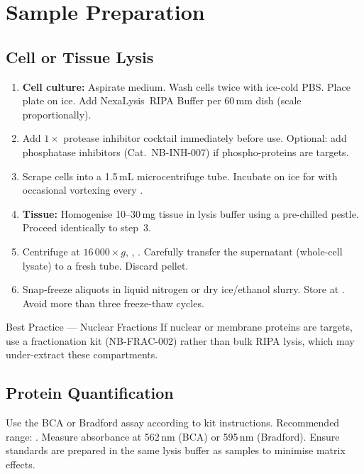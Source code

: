 
\section{Sample Preparation}

\subsection{Cell or Tissue Lysis}

\begin{enumerate}
  \item \textbf{Cell culture:} Aspirate medium. Wash cells twice with ice-cold PBS.
        Place plate on ice. Add  NexaLysis\texttrademark~RIPA Buffer
        per 60\,mm dish (scale proportionally).
  \item Add $1\times$ protease inhibitor cocktail immediately before use. Optional:
        add phosphatase inhibitors (Cat.\ NB-INH-007) if phospho-proteins are targets.
  \item Scrape cells into a 1.5\,mL microcentrifuge tube. Incubate on ice for
         with occasional vortexing every .
  \item \textbf{Tissue:} Homogenise 10--30\,mg tissue in  lysis buffer
        using a pre-chilled pestle. Proceed identically to step~3.
  \item Centrifuge at $16\,000 \times g$, , .
        Carefully transfer the supernatant (whole-cell lysate) to a fresh tube.
        Discard pellet.
  \item Snap-freeze aliquots in liquid nitrogen or dry ice/ethanol slurry.
        Store at . Avoid more than three freeze-thaw cycles.
\end{enumerate}

\par
\begin{tipbox}{Best Practice — Nuclear Fractions}
If nuclear or membrane proteins are targets, use a fractionation kit
(NB-FRAC-002) rather than bulk RIPA lysis, which may under-extract these
compartments.
\end{tipbox}

\subsection{Protein Quantification}

\par\vspace{4pt}
Use the BCA or Bradford assay according to kit instructions. Recommended range:
. Measure absorbance at 562\,nm (BCA) or
595\,nm (Bradford). Ensure standards are prepared in the same lysis buffer as
samples to minimise matrix effects.

